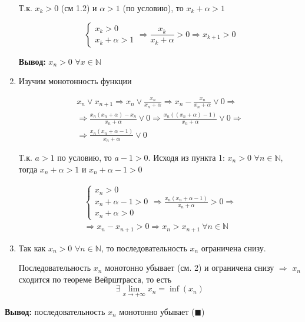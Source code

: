 \documentclass[class=article,a4paper,12pt,crop=false]{standalone}
\begin{document}
\begin{enumerate}
{\begin{enumerate}
{                Т.к. $x_k > 0$ (см 1.2) и $\alpha > 1$ (по условию), то
                $x_k + \alpha > 1$

                \begin{equation}
                    \begin{cases}
                        x_k > 0 \\
                        x_k + \alpha > 1
                    \end{cases}
                    \Rightarrow \frac{x_k}{x_k + \alpha} > 0
                    \Rightarrow x_{k + 1} > 0
                \end{equation}
            }
        \end{enumerate}

        \textbf{Вывод:} $x_n > 0$ $\forall x \in \mathbb{N}$
    }
    \item {
        Изучим монотонность функции

        \begin{multline}
            x_n \lor x_{n + 1} \Rightarrow x_n \lor \frac{x_n}{x_n + \alpha}
            \Rightarrow x_n - \frac{x_n}{x_n + \alpha} \lor 0 \Rightarrow \\
            \Rightarrow \frac{x_n(x_n + \alpha) - x_n}{x_n + \alpha} \lor 0
            \Rightarrow \frac{x_n((x_n + \alpha) - 1)}{x_n + \alpha} \lor 0 \Rightarrow \\
            \Rightarrow \frac{x_n(x_n + \alpha - 1)}{x_n + \alpha} \lor 0
        \end{multline}

        Т.к. $a > 1$ по условию, то $a - 1 > 0$. Исходя из пункта 1:
        $x_n > 0$ $\forall n \in \mathbb{N}$, тогда $x_n + \alpha > 1$
        и $x_n + \alpha - 1 > 0$

        \begin{multline}
            \begin{cases}
                x_n > 0 \\
                x_n + \alpha - 1 > 0 \\
                x_n + \alpha > 0
            \end{cases}
            \Rightarrow \frac{x_n(x_n + \alpha - 1)}{x_n + \alpha} > 0
            \Rightarrow \\ \Rightarrow x_n - x_{n + 1} > 0 \Rightarrow
            x_n > x_{n + 1} \: \forall n \in \mathbb{N}
        \end{multline}
    }
    \item {
        Так как $x_n > 0$ $\forall n \in \mathbb{N}$, то последовательность
        $x_n$ ограничена снизу.
        
        Последовательность $x_n$ монотонно убывает (см. 2) и
        ограничена снизу $\Rightarrow$ $x_n$ сходится по
        теореме Вейрштрасса, то есть \[\exists \lim\limits_{x \to + \infty}{x_n} = \inf (x_n)\]
    }
  \end{enumerate}

  \textbf{Вывод:} последовательность $x_n$ монотонно убывает ($\blacksquare$)
\end{document}
